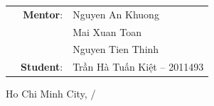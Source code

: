 \documentclass[12pt, a4paper]{article}
\begin{document}
\begin{titlepage}
    \vspace{1cm}
    \begin{table}[H]
        \begin{tabular}{rrl}
        \hspace{5 cm} & \textbf{Mentor}: & Nguyen An Khuong \\
        & & Mai Xuan Toan \\
        & & Nguyen Tien Thinh \\
        
        & \textbf{Student}: & Trần Hà Tuấn Kiệt -- 2011493 \\
        
        \end{tabular}
        \end{table}
    \vspace{1cm}

    \begin{center}
        {\large Ho Chi Minh City, \the\month/\the\year}
    \end{center}
\end{titlepage}


\newpage
\end{document}
